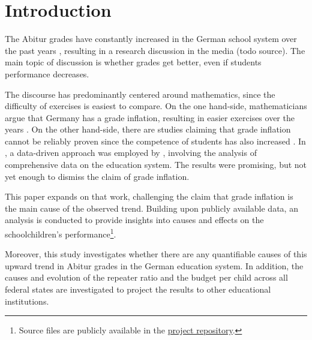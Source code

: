 \section{Introduction} \label{sec:Introduction}
The Abitur grades have constantly increased in the German school system over the past years \cite{kultusminister_konferenz_abiturnoten_nodate}, resulting in a research discussion in the media (todo source). The main topic of discussion is whether grades get better, even if students performance decreases.

The discourse has predominantly centered around mathematics, since the difficulty of exercises is easiest to compare. On the one hand-side, mathematicians argue that Germany has a grade inflation, resulting in easier exercises over the years \cite{kuhnel_modellierungskompetenz_2015, jahnke_hamburger_2014,lemmermeyer_zentralabitur_nodate}. On the other hand-side, there are studies claiming that grade inflation cannot be reliably proven since the competence of students has also increased \cite{schleithoff_noteninflation_2015}. In \citeyear{grozinger_gibt_2015}, a data-driven approach was employed by \citeauthor{grozinger_gibt_2015}, involving the analysis of comprehensive data on the education system. The results were promising, but not yet enough to dismiss the claim of grade inflation.

This paper expands on that work, challenging the claim that grade inflation is the main cause of the observed trend. Building upon publicly available data, an analysis is conducted to provide insights into causes and effects on the schoolchildren's performance\footnote{Source files are publicly available in the \href{https://github.com/KarylReyne/DataLiteracyWS23}{project repository}.}.

Moreover, this study investigates whether there are any quantifiable causes of this upward trend in Abitur grades in the German education system. In addition, the causes and evolution of the repeater ratio and the budget per child across all federal states are investigated to project the results to other educational institutions.

